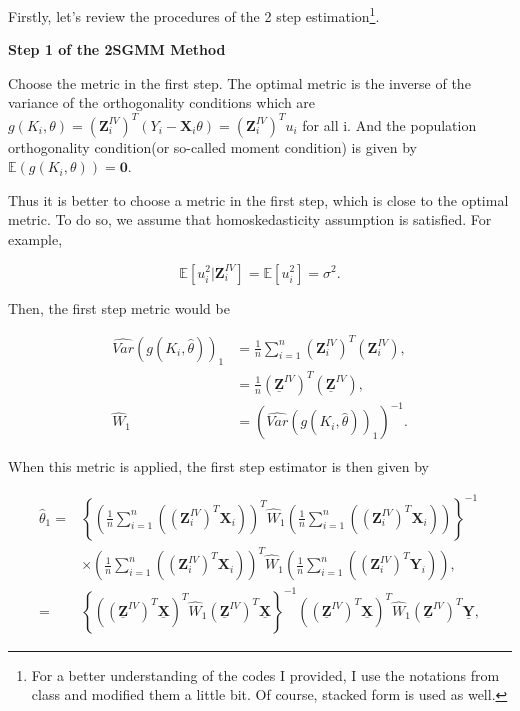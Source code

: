 \documentclass[
  12pt,
]{article}
\begin{document}
Firstly, let's review the procedures of the 2 step estimation\footnote{For a better understanding of the codes I provided, I use the notations from class and modified them a little bit. Of course, stacked form is used as well.}.

\noindent
\textbf{\color{blue} Step 1 of the 2SGMM Method}

\noindent
\color{black} Choose the metric in the first step. The optimal metric is the inverse of the variance of the orthogonality conditions which are \(g(K_i, \theta) = (\mathbf{Z}_{i}^{IV})^T (Y_i - \mathbf{X}_i\theta) = (\mathbf{Z}_{i}^{IV})^T u_i\) for all i. And the population orthogonality condition(or so-called moment condition) is given by \(\mathbb{E}\left(g(K_i, \theta)\right) = \mathbf{0}\).

Thus it is better to choose a metric in the first step, which is close to the optimal metric. To do so, we assume that homoskedasticity assumption is satisfied. For example,

\[  \mathbb{E}[u_i^2 | \mathbf{Z}_{i}^{IV}] = \mathbb{E}[u_i^2] = \sigma^2. \]

Then, the first step metric would be

\begin{align*}
    \widehat{Var}(g(K_i, \widehat{\theta}))_1 
    & = \frac{1}{n}\sum_{i=1}^{n}(\mathbf{Z}_{i}^{IV})^T (\mathbf{Z}_{i}^{IV}),\\
    & = \frac{1}{n} (\mathbf{\underline{Z}}^{IV})^T (\mathbf{\underline{Z}}^{IV}),\\
    \widehat{W}_1 & = \left(\widehat{Var}(g(K_i, \widehat{\theta}))_1 \right)^{-1}.
\end{align*}

When this metric is applied, the first step estimator is then given by

\begin{align*}
    \hat{\theta}_1  = & \left\{
    \left(\frac{1}{n}\sum_{i=1}^{n}((\mathbf{Z}_{i}^{IV})^T \mathbf{X}_{i}) \right)^T \widehat{W}_1 \left(\frac{1}{n}\sum_{i=1}^{n}((\mathbf{Z}_{i}^{IV})^T \mathbf{X}_{i}) \right) \right\}^{-1}\\
    & \times\left(\frac{1}{n}\sum_{i=1}^{n}((\mathbf{Z}_{i}^{IV})^T \mathbf{X}_{i}) \right)^T \widehat{W}_1 \left(\frac{1}{n}\sum_{i=1}^{n}((\mathbf{Z}_{i}^{IV})^T \mathbf{Y}_{i}) \right),\\
    = & \left\{\left((\mathbf{\underline{Z}}^{IV})^T \mathbf{\underline{X}} \right)^T \widehat{W}_1 (\mathbf{\underline{Z}}^{IV})^T \mathbf{\underline{X}} \right\}^{-1} \left((\mathbf{\underline{Z}}^{IV})^T \mathbf{\underline{X}} \right)^T \widehat{W}_1 (\mathbf{\underline{Z}}^{IV})^T \mathbf{\underline{Y}},
\end{align*}
\end{document}
